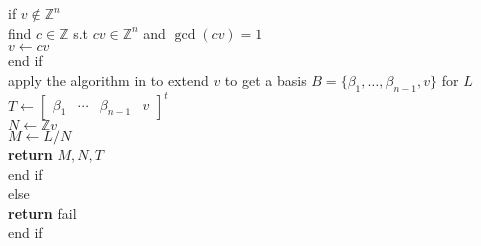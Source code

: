 \documentclass{article}
\theoremstyle{plain}
\theoremstyle{definition}
\newcommand{\Z}{\ensuremath{\mathbb{Z}}}
\begin{document}
\begin{algorithm}[H]
\begin{algorithmic}[1]
	    \hspace{0.5 in} if $v \notin \Z^n$ \\
	    \hspace{1in} find $c \in \Z$ s.t $cv \in \Z^n$ and $\gcd(cv) = 1$\\
	    \hspace{1in} $v \gets cv$\\
	    \hspace{0.5 in} end if\\
	    \hspace{0.5in} apply the algorithm in \cite{LatticeBase} to extend $v$ to get a basis $B = \lbrace \beta_1, \ldots, \beta_{n-1},v\rbrace$ for $L$\\
	    \hspace{0.5in} $T \gets \begin{bmatrix}
	    \beta_1 &  \cdots &  \beta_{n-1}& v
	    \end{bmatrix}^t$\\
		\hspace{0.5in} $N \gets \Z v$\\
		\hspace{0.5in} $M \gets L/N$\\
		\hspace{0.5in} \textbf{return} $M,N,T$\\
	  \hspace{0.5in} end if\\
	  else\\
	     \hspace{0.5in}  \textbf{return} fail\\
	     end if
	 	\end{algorithmic}
\end{algorithm}
\end{document}
